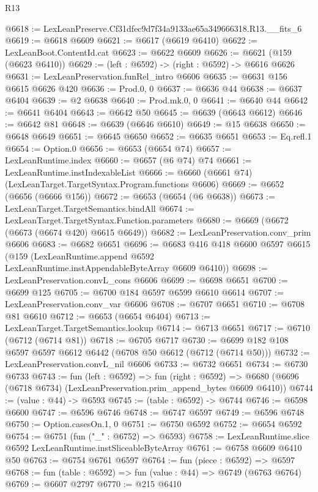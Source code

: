 \begin{lexlean}{R13}
\begin{coremodule}
@6618 := LexLeanPreserve.Cf31dfec9d7f34a9133ae65a349666318.R13.__fits_6
@6619 := @6618 @6609
@6621 := @6617 (@6619 @6410)
@6622 := LexLeanBoot.ContentId.cat
@6623 := @6622 @6609
@6626 := @6621 (@159 (@6623 @6410))
@6629 := (left : @6592) -> (right : @6592) -> @6616 @6626
@6631 := LexLeanPreservation.funRel_intro @6606
@6635 := @6631 @156 @6615 @6626 @420
@6636 := Prod.{0, 0}
@6637 := @6636 @44
@6638 := @6637 @6404
@6639 := @2 @6638
@6640 := Prod.mk.{0, 0}
@6641 := @6640 @44
@6642 := @6641 @6404
@6643 := @6642 @50
@6645 := @6639 (@6643 @6612)
@6646 := @6642 @81
@6648 := @6639 (@6646 @6610)
@6649 := @15 @6638
@6650 := @6648 @6649
@6651 := @6645 @6650
@6652 := @6635 @6651
@6653 := Eq.refl.{1}
@6654 := Option.{0}
@6656 := @6653 (@6654 @74)
@6657 := LexLeanRuntime.index
@6660 := @6657 (@6 @74) @74
@6661 := LexLeanRuntime.instIndexableList
@6666 := @6660 (@6661 @74) (LexLeanTarget.TargetSyntax.Program.functions @6606)
@6669 := @6652 (@6656 (@6666 @156))
@6672 := @6653 (@6654 (@6 @6638))
@6673 := LexLeanTarget.TargetSemantics.bindAll
@6674 := LexLeanTarget.TargetSyntax.Function.parameters
@6680 := @6669 (@6672 (@6673 (@6674 @420) @6615 @6649))
@6682 := LexLeanPreservation.conv_prim @6606
@6683 := @6682 @6651
@6696 := @6683
    @416
    @418
    @6600
    @6597
    @6615
    (@159 (LexLeanRuntime.append @6592 LexLeanRuntime.instAppendableByteArray @6609 @6410))
@6698 := LexLeanPreservation.convL_cons @6606
@6699 := @6698 @6651
@6700 := @6699 @125
@6705 := @6700 @184 @6597 @6599 @6610 @6614
@6707 := LexLeanPreservation.conv_var @6606
@6708 := @6707 @6651
@6710 := @6708 @81 @6610
@6712 := @6653 (@6654 @6404)
@6713 := LexLeanTarget.TargetSemantics.lookup
@6714 := @6713 @6651
@6717 := @6710 (@6712 (@6714 @81))
@6718 := @6705 @6717
@6730 := @6699 @182 @108 @6597 @6597 @6612 @6442 (@6708 @50 @6612 (@6712 (@6714 @50)))
@6732 := LexLeanPreservation.convL_nil @6606
@6733 := @6732 @6651
@6734 := @6730 @6733
@6743 := fun (left : @6592) =>
  fun (right : @6592) =>
  @6680 (@6696 (@6718 @6734) (LexLeanPreservation.prim_append_bytes @6609 @6410))
@6744 := (value : @44) -> @6593
@6745 := (table : @6592) -> @6744
@6746 := @6598 @6600
@6747 := @6596 @6746
@6748 := @6747 @6597
@6749 := @6596 @6748
@6750 := Option.casesOn.{1, 0}
@6751 := @6750 @6592
@6752 := @6654 @6592
@6754 := @6751 (fun ("_" : @6752) => @6593)
@6758 := LexLeanRuntime.slice @6592 LexLeanRuntime.instSliceableByteArray
@6761 := @6758 @6609 @6410 @50
@6763 := @6754 @6761 @6597
@6764 := fun (piece : @6592) => @6597
@6768 := fun (table : @6592) => fun (value : @44) => @6749 (@6763 @6764)
@6769 := @6607 @2797
@6770 := @215 @6410

\end{coremodule}
\end{lexlean}
